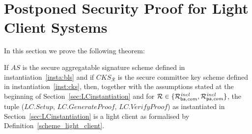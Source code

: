 \section{Postponed Security Proof for Light Client Systems}
\label{supplementary_proof_sec_soundness}

\noindent In this section we prove the following theorem:

\begin{theorem} 
\label{thm_lc_soundness}
If $\mathit{AS}$ is the secure aggregatable signature scheme defined in instantiation~\ref{insta:bls} and if 
$\mathit{CKS_{\mathcal{R}}}$ is the secure committee key scheme defined in instantiation~\ref{inst:cks}, 
then, together with the assumptions stated at the beginning of Section~\ref{sec:LCinstantiation} and for 
$\mathcal{R} \in \{ \mathcal{R}^{\mathit{incl}}_{\mathsf{ba},\mathit{com}}, \mathcal{R}^{\mathit{incl}}_{\mathsf{pa},\mathit{com}} \}$, the tuple ($\mathit{LC.Setup}$, $\mathit{LC.GenerateProof}$, $\mathit{LC.VerifyProof}$) 
as instantiated in Section~\ref{sec:LCinstantiation} is a light client  as formalised by Definition~\ref{scheme_light_client}.
\end{theorem}

